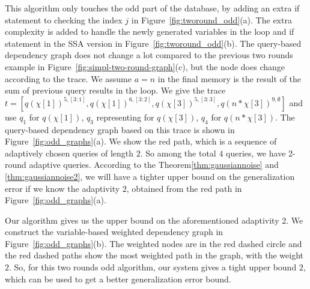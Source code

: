 %
This algorithm only touches the odd part of the database, by adding an extra if statement to checking the index $j$ in Figure~\ref{fig:tworound_odd}(a). The extra complexity is added to handle the newly generated variables in the loop and if statement in the SSA version in Figure~\ref{fig:tworound_odd}(b). 
The query-based dependency graph does not change a lot compared to the previous two rounds example in Figure~\ref{fig:simpl-two-round-graph}(c), but the node does change according to the trace. We assume $a = n$ in the final memory is the result of the sum of previous query results in the loop.
We give the trace $t = [q(\chi[1])^{5,[3:1]}, q(\chi[1])^{6,[3:2]}, q(\chi[3])^{5,[3:3]}, q(n* \chi[3])^{9,\emptyset} ]$ and use $q_1$ for $q(\chi[1])$, $q_3$ representing for $q(\chi[3])$, $q_4$ for $q(n* \chi[3])$. The query-based dependency graph based on this trace is shown in Figure~\ref{fig:odd_graphs}(a). We show the red path, which is a sequence of adaptively chosen queries of length $2$. So among the total $4$ queries, we have 2-round adaptive queries. According to the Theorem\ref{thm:gaussiannoise} and \ref{thm:gaussiannoise2}, we will have a tighter upper bound on the generalization error if we know the adaptivity $2$, obtained from the red path in Figure~\ref{fig:odd_graphs}(a). 

Our algorithm {\THESYSTEM} gives us the upper bound on the aforementioned adaptivity $2$. We construct the variable-based weighted dependency graph in Figure~\ref{fig:odd_graphs}(b). The weighted nodes are in the red dashed circle and the red dashed paths show the most weighted path in the graph, with the weight $2$. So, for this two rounds odd algorithm, our system gives a tight upper bound $2$, which can be used to get a better generalization error bound.




